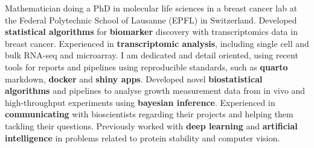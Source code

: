 

\begin{cvparagraph}

Mathematician doing a PhD in molecular life sciences in a breast cancer lab at the
Federal Polytechnic School of Lausanne (EPFL) in Switzerland. 
Developed \textbf{statistical algorithms} for \textbf{biomarker} discovery with
transcriptomics data in breast cancer. 
Experienced in \textbf{transcriptomic analysis}, including single cell and bulk RNA-seq
and microarray. I am dedicated and detail oriented, 
using recent tools for reports and pipelines using
reproducible standards, such as \textbf{quarto} markdown, \textbf{docker} and \textbf{shiny apps}. 
Developed novel \textbf{biostatistical algorithms} and
pipelines to analyse growth measurement data from in vivo and 
high-throughput experiments using \textbf{bayesian inference}. Experienced 
in \textbf{communicating} with bioscientists regarding their projects
and helping them tackling their questions.
Previously worked with \textbf{deep learning} and \textbf{artificial intelligence} in problems related
to protein stability and computer vision.

\end{cvparagraph}
